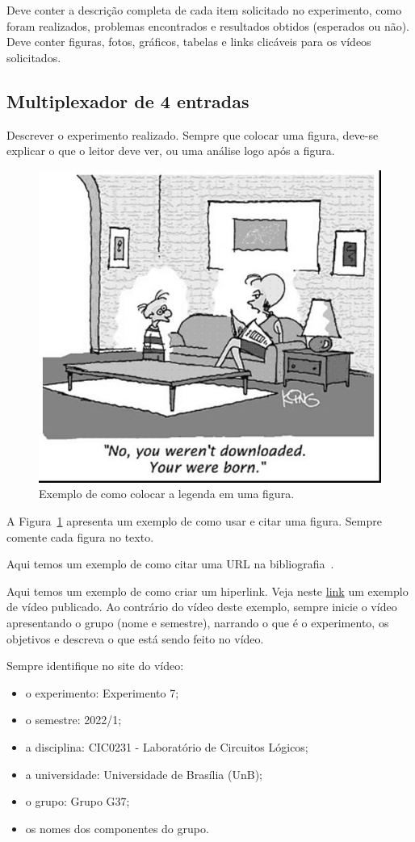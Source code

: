 \documentclass[12pt]{article}
\begin{document}
Deve conter a descrição completa de cada item solicitado no experimento, como foram realizados, problemas encontrados e resultados obtidos (esperados ou não). Deve conter figuras, fotos, gráficos, tabelas e links clicáveis para os vídeos solicitados.

\subsection{Multiplexador de 4 entradas}
\label{sec:Mux}

Descrever o experimento realizado. Sempre que colocar uma figura, deve-se explicar o que o leitor deve ver, ou uma análise logo após a figura. 

\begin{figure}[H]
    \centering
    \includegraphics[width=.5\textwidth]{fig1.jpg}
    \caption{Exemplo de como colocar a legenda em uma figura.}
    \label{fig:exemplo}
\end{figure}

A Figura~\ref{fig:exemplo} apresenta um exemplo de como usar e citar uma figura. Sempre comente cada figura no texto.

Aqui temos um exemplo de como citar uma URL na bibliografia~\cite{systemverilog}.

Aqui temos um exemplo de como criar um hiperlink. Veja neste
\href{https://www.youtube.com/watch?v=itWbXy0Qzw0}{link} um exemplo de vídeo publicado. Ao contrário do vídeo deste exemplo, sempre inicie o vídeo apresentando o grupo (nome e semestre), narrando o que é o experimento, os objetivos e descreva o que está sendo feito no vídeo.

Sempre identifique no site do vídeo:
\begin{itemize}
    \item o experimento: Experimento 7;
    \item o semestre: 2022/1;
    \item a disciplina: CIC0231 - Laboratório de Circuitos Lógicos;
    \item a universidade: Universidade de Brasília (UnB);
    \item o grupo: Grupo G37;
    \item os nomes dos componentes do grupo.
\end{itemize}
\end{document}
